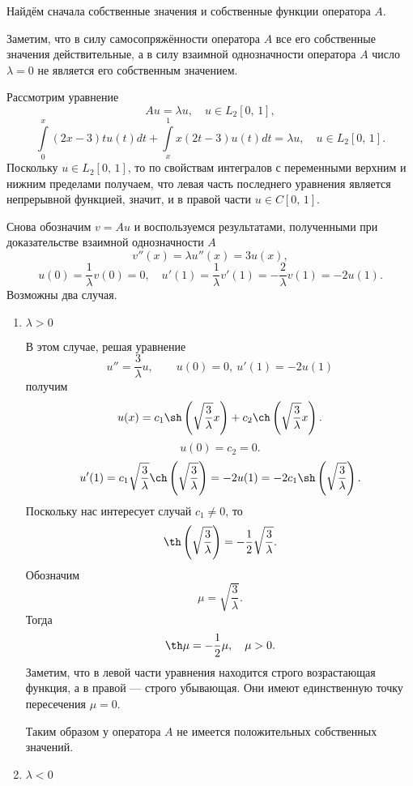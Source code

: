 \documentclass[a4paper]{article}
\begin{document}
\begin{sol}
\begin{enumerate}
	Найдём сначала
	собственные значения и собственные функции оператора
	$A$.

Заметим, что в силу самосопряжённости оператора $A$ все его
собственные значения действительные, а в силу взаимной
однозначности оператора $A$ число $\lambda=0$ не
является его собственным значением.

Рассмотрим уравнение
\[
	Au=\lambda u, \quad u \in L_2[0,\,1],
\] 
\[
\int\limits_{0}^{x} (2x-3)tu(t)dt+
	\int\limits_{x}^{1} x(2t-3)u(t)dt=
	\lambda u,\quad u \in L_2[0,\,1]
.\] 
Поскольку $u \in L_2[0,\,1]$, то по свойствам интегралов
с переменными верхним и нижним пределами получаем, что левая
часть последнего уравнения является непрерывной функцией,
значит, и в правой части $u \in C[0,\,1]$.

Снова обозначим $v=Au$ и воспользуемся результатами, полученными
при доказательстве взаимной однозначности $A$
\[
	v''(x)=\lambda u''(x)=3 u(x)
,\] 
\[
	u(0)=\frac{1}{\lambda}v(0)=0,\quad
	u'(1)=\frac{1}{\lambda}v'(1)=-\frac{2}{\lambda}v(1)=
	-2u(1)
.\] 
Возможны два случая.
\begin{enumerate}
	\item $\lambda>0$

		В этом случае, решая уравнение
		\[
		u''=\frac{3}{\lambda}u,\qquad
		u(0)=0,\ u'(1)=-2u(1)
		\]
		получим
\[
	u(x)= c_1 \sh \left( \sqrt{\frac{3}{\lambda}} x \right) +
	c_2 \ch \left( \sqrt{\frac{3}{\lambda}} x \right) 
.\] 
\[
	u(0)=c_2=0
.\] 
\[
	u'(1)= c_1\sqrt{\frac{3}{\lambda}}  \ch \left( \sqrt{\frac{3}{\lambda}}  \right) =
	-2u(1)=-2c_1 \sh\left( \sqrt{\frac{3}{\lambda}}  \right) 
.\] 
Поскольку нас интересует случай $c_1\neq 0$, то
\[
	\th \left( \sqrt{\frac{3}{\lambda}}  \right) =
	-\frac{1}{2}\sqrt{\frac{3}{\lambda}} 
.\] 
Обозначим
\[
\mu= \sqrt{\frac{3}{\lambda}} 
.\] 
Тогда
\[
\th \mu=-\frac{1}{2}\mu,\quad \mu>0
.\] 
Заметим, что в левой части уравнения находится строго возрастающая
функция, а в правой --- строго убывающая. Они имеют единственную
точку пересечения $\mu=0$.

Таким образом у оператора $A$ не имеется положительных
собственных значений.
\item $\lambda<0$ 
	

\end{enumerate}
\end{enumerate}
\end{sol}
\end{document}
